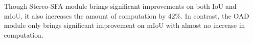 \documentclass{article}
\begin{document}
	Though Stereo-SFA module brings significant improvements on both IoU and mIoU, it also increases the amount of computation by 42\%. In contrast, the OAD module only brings significant improvement on mIoU with almost no increase in computation.
	
	
	\begin{table}
		\centering
		\caption{Architecture ablation. Results are reported on SemanticKITTI \textit{val}.}
		\label{ArchitectureAblation}
	\end{table}
\end{document}
